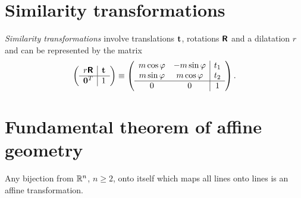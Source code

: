 


\section{Similarity transformations}

{\em Similarity transformations}  involve translations ${\bf t}$, rotations $\textsf{\textbf{R}}$ and a dilatation $r$
and can be represented by the matrix
\begin{equation}
\left(
\begin{array}{c|cccc}
r \textsf{\textbf{R}}&{\bf t}\\
\hline
{\bf 0}^T&1
\end{array}
\right)
\equiv
\left(
\begin{array}{cc|ccc}
m\cos \varphi &-m\sin \varphi &{t}_1\\
m\sin \varphi &m\cos \varphi &{t}_2\\
\hline
0&0&1
\end{array}
\right)
.
\end{equation}




\section{Fundamental theorem of affine geometry}

Any bijection from ${\Bbb R}^n$, $n\ge 2$,  onto itself
which  maps all lines onto lines is an affine transformation.



